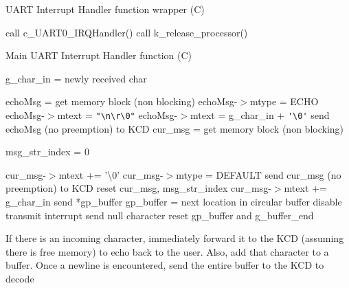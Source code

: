 \documentclass[12pt]{report}
\begin{document}
\begin{algorithm}[H]
	\caption{UART Interrupt Handler function wrapper (C)}
	\begin{algorithmic}[1]
	    \State call c_UART0_IRQHandler()
	      \State call k_release_processor()
	    \EndIf
	  \EndFunction
	\end{algorithmic}
\end{algorithm}

\begin{algorithm}[H]
	\caption{Main UART Interrupt Handler function (C)}
	\begin{algorithmic}[1]
	      \State g_char_in = newly received char
	        \State\Return
	      \EndIf

	      \State echoMsg = get memory block (non blocking)
	        \State echoMsg-$>$mtype = ECHO
	          \State echoMsg-$>$mtext = \verb|"\n\r\0"|
	        \Else
	          \State echoMsg-$>$mtext = g_char_in + \verb|'\0'|
	        \EndIf
	        \State send echoMsg (no preemption) to KCD
	      \EndIf
	        \State cur_msg = get memory block (non blocking)
	          \State\Return
	        \EndIf

	        \State msg_str_index = 0
	      \EndIf

	        \State cur_msg-$>$mtext += '\textbackslash 0'
	        \State cur_msg-$>$mtype = DEFAULT
	        \State send cur_msg (no preemption) to KCD
	        \State reset cur_msg, msg_str_index
	      \Else
	        \State cur_msg-$>$mtext += g_char_in
	      \EndIf
	        \State send *gp_buffer
	        \State gp_buffer = next location in circular buffer
	      \Else
	        \State disable transmit interrupt
	        \State send null character
	        \State reset gp_buffer and g_buffer_end
	      \EndIf
	    \EndIf
	  \EndFunction
	\end{algorithmic}
\end{algorithm}

If there is an incoming character, immediately forward it to the KCD (assuming there is free memory) to echo back to the user. Also, add that character to a buffer. Once a newline is encountered, send the entire buffer to the KCD to decode
\end{document}
